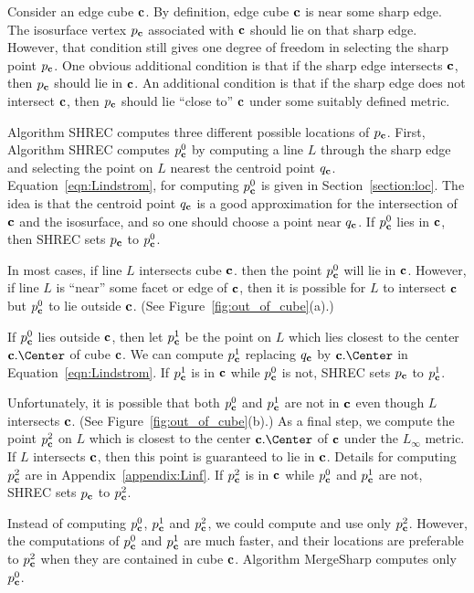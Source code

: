 Consider an edge cube $\mathbf{c}$.
By definition, edge cube $\mathbf{c}$ is near some sharp edge.
The isosurface vertex $p_{\mathbf{c}}$ associated with $\mathbf{c}$ should lie
on that sharp edge.
However, that condition still gives one degree of freedom in selecting
the sharp point $p_{\mathbf{c}}$.
One obvious additional condition is that if the sharp edge intersects $\mathbf{c}$,
then $p_{\mathbf{c}}$ should lie in $\mathbf{c}$.
An additional condition is that if the sharp edge does not intersect $\mathbf{c}$,
then $p_{\mathbf{c}}$ should lie ``close to'' $\mathbf{c}$ under some suitably defined metric.

Algorithm SHREC computes three different possible locations of $p_{\mathbf{c}}$.
First, Algorithm SHREC computes $p^0_{\mathbf{c}}$ 
by computing a line $L$ through the sharp edge and 
selecting the point on $L$ nearest the centroid point $q_{\mathbf{c}}$.
Equation~\ref{eqn:Lindstrom}, for computing $p^0_{\mathbf{c}}$ is given
in Section~\ref{section:loc}.
The idea is that the centroid point $q_{\mathbf{c}}$ is a good approximation
for the intersection of $\mathbf{c}$ and the isosurface,
and so one should choose a point near $q_{\mathbf{c}}$.
If $p^0_{\mathbf{c}}$ lies in $\mathbf{c}$, then SHREC sets $p_{\mathbf{c}}$ to $p^0_{\mathbf{c}}$.

In most cases, if line $L$ intersects cube $\mathbf{c}$.
then the point $p^0_{\mathbf{c}}$ will lie in $\mathbf{c}$.
However, if line $L$ is ``near'' some facet or edge of $\mathbf{c}$,
then it is possible for $L$ to intersect $\mathbf{c}$ but $p^0_{\mathbf{c}}$ to lie
outside $\mathbf{c}$.
(See Figure~\ref{fig:out_of_cube}(a).)

If $p^0_{\mathbf{c}}$ lies outside $\mathbf{c}$,
then let $p^1_{\mathbf{c}}$ be the point on $L$ which lies closest 
to the center $\cb.\Center$ of cube $\mathbf{c}$.
We can compute $p^1_{\mathbf{c}}$ replacing $q_{\mathbf{c}}$ by $\cb.\Center$
in Equation~\ref{eqn:Lindstrom}.
If $p^1_{\mathbf{c}}$ is in $\mathbf{c}$ while $p^0_{\mathbf{c}}$ is not,
SHREC sets $p_{\mathbf{c}}$ to $p^1_{\mathbf{c}}$.

Unfortunately, it is possible that both $p^0_{\mathbf{c}}$ and $p^1_{\mathbf{c}}$ 
are not in $\mathbf{c}$ even though $L$ intersects $\mathbf{c}$.
(See Figure~\ref{fig:out_of_cube}(b).)
As a final step, we compute the point $p^2_{\mathbf{c}}$ on $L$ which is closest 
to the center $\cb.\Center$ of $\mathbf{c}$ under the $L_\infty$ metric.
If $L$ intersects $\mathbf{c}$, then this point is guaranteed to lie in $\mathbf{c}$.
Details for computing $p^2_{\mathbf{c}}$ are in Appendix~\ref{appendix:Linf}.
If $p^2_{\mathbf{c}}$ is in $\mathbf{c}$ while $p^0_{\mathbf{c}}$ and $p^1_{\mathbf{c}}$ are not,
SHREC sets $p_{\mathbf{c}}$ to $p^2_{\mathbf{c}}$.

Instead of computing $p^0_{\mathbf{c}}$, $p^1_{\mathbf{c}}$ and $p^2_{\mathbf{c}}$, 
we could compute and use only $p^2_{\mathbf{c}}$.
However, the computations of $p^0_{\mathbf{c}}$ and $p^1_{\mathbf{c}}$ are much faster,
and their locations are preferable to $p^2_{\mathbf{c}}$ when they are
contained in cube $\mathbf{c}$.
Algorithm MergeSharp computes only $p^0_{\mathbf{c}}$.


